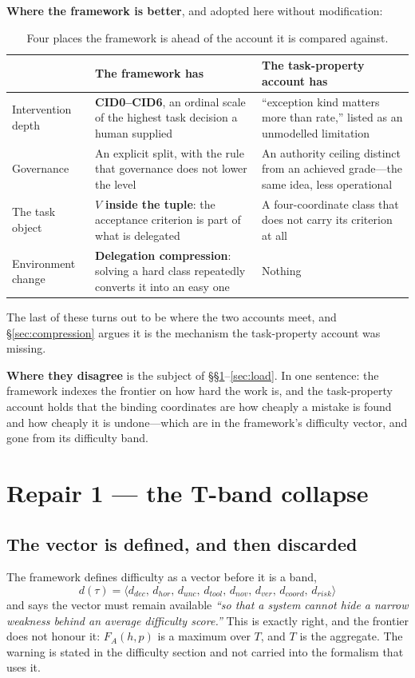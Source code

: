 \documentclass[11pt]{article}
\theoremstyle{definition}
\newcommand{\dver}{\ensuremath{d_{ver}}}
\newcommand{\drisk}{\ensuremath{d_{risk}}}
\begin{document}
\textbf{Where the framework is better}, and adopted here without modification:

\begin{table}[h]
\centering\small
\begin{tabularx}{\textwidth}{@{}lYY@{}}
\toprule
& The framework has & The task-property account has \\
\midrule
Intervention depth & \textbf{CID0--CID6}, an ordinal scale of the highest task decision a human supplied & ``exception kind matters more than rate,'' listed as an unmodelled limitation \\
Governance & An explicit split, with the rule that governance does not lower the level & An authority ceiling distinct from an achieved grade---the same idea, less operational \\
The task object & $V$ \textbf{inside the tuple}: the acceptance criterion is part of what is delegated & A four-coordinate class that does not carry its criterion at all \\
Environment change & \textbf{Delegation compression}: solving a hard class repeatedly converts it into an easy one & Nothing \\
\bottomrule
\end{tabularx}
\caption{Four places the framework is ahead of the account it is compared against.}
\end{table}

The last of these turns out to be where the two accounts meet, and \S\ref{sec:compression} argues it is the mechanism the task-property account was missing.

\textbf{Where they disagree} is the subject of \S\S\ref{sec:collapse}--\ref{sec:load}. In one sentence: the framework indexes the frontier on how hard the work is, and the task-property account holds that the binding coordinates are how cheaply a mistake is found and how cheaply it is undone---which are in the framework's difficulty vector, and gone from its difficulty band.

\section{Repair 1 --- the T-band collapse}\label{sec:collapse}

\subsection{The vector is defined, and then discarded}

The framework defines difficulty as a vector before it is a band,
\begin{equation}
d(\tau)=\langle d_{dec},\, d_{hor},\, d_{unc},\, d_{tool},\, d_{nov},\, \dver,\, d_{coord},\, \drisk \rangle
\end{equation}
and says the vector must remain available \emph{``so that a system cannot hide a narrow weakness behind an average difficulty score.''} This is exactly right, and the frontier does not honour it: $F_A(h,p)$ is a maximum over $T$, and $T$ is the aggregate. The warning is stated in the difficulty section and not carried into the formalism that uses it.
\end{document}
